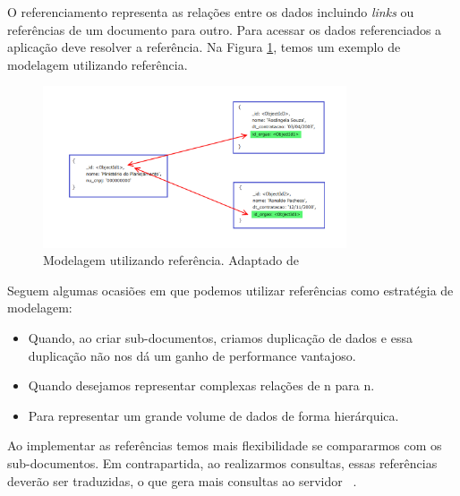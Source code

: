 
O referenciamento representa as relações entre os dados incluindo \textit{links} ou referências de um documento para outro. Para acessar os dados referenciados a aplicação deve resolver a referência. Na Figura \ref{fig:referencia}, temos um exemplo de modelagem utilizando referência.

	\begin{figure}[!htbp]
		\begin{center}
			\includegraphics[width=0.8\textwidth]{referencia}
		\end{center}
		\caption{ Modelagem utilizando referência. Adaptado de ~\cite{sitemongodb}}
		\label{fig:referencia}
	\end{figure}

Seguem algumas ocasiões em que podemos utilizar referências como estratégia de modelagem:

\begin{itemize}
	\item Quando, ao criar sub-documentos, criamos duplicação de dados e essa duplicação não nos dá um ganho de performance vantajoso.
	\item Quando desejamos representar complexas relações de n para n.
	\item Para representar um grande volume de dados de forma hierárquica.
\end{itemize}

Ao implementar as referências temos mais flexibilidade se compararmos com os sub-documentos. Em contrapartida, ao realizarmos consultas, essas referências deverão ser traduzidas, o que gera mais consultas ao servidor ~\cite{Orendanalysisand}.


